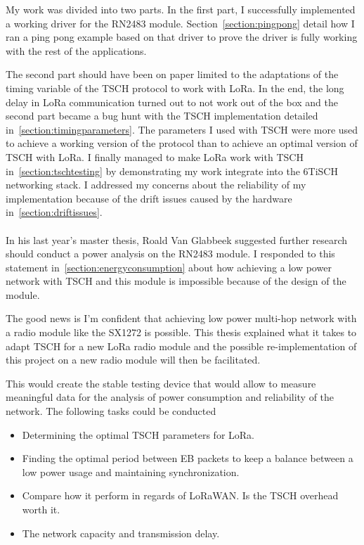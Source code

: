 \documentclass[11pt]{report}
\begin{document}
My work was divided into two parts. 
In the first part, I successfully implemented a working driver for the RN2483
module. 
Section~\ref{section:pingpong} detail how I ran a ping pong
example based on that driver to prove the driver is fully working with the
rest of the applications.

The second part should have been on paper limited to the adaptations of the
timing variable of the TSCH protocol to work with LoRa.
In the end, the long delay in LoRa communication turned out to 
not work out of the box and the second part became a
bug hunt with the TSCH implementation detailed in~\ref{section:timingparameters}.
The parameters I used with TSCH were more used to achieve a working version of
the protocol than to achieve an optimal version of TSCH with LoRa.
I finally managed to make LoRa work with TSCH in~\ref{section:tschtesting} by
demonstrating my work integrate into the 6TiSCH networking stack.
I addressed my concerns about the reliability of my implementation
because of the drift issues caused by the hardware in~\ref{section:driftissues}.

\paragraph{}

In his last year's master thesis, Roald Van Glabbeek suggested further research
should conduct a power analysis on the RN2483 module.
I responded to this statement in~\ref{section:energyconsumption} about how
achieving a low power network with TSCH and this module is impossible because
of the design of the module.

The good news is I'm confident that achieving low power multi-hop network with 
a radio module like the SX1272 is possible.
This thesis explained what it takes to adapt TSCH for a new LoRa radio
module and the possible re-implementation of this project on a new radio module 
will then be facilitated. 

This would create the stable testing device that would allow to measure meaningful 
data for the analysis of power consumption and reliability of the network.
The following tasks could be conducted

\begin{itemize}
  \item Determining the optimal TSCH parameters for LoRa. 
  \item Finding the optimal period between EB packets to keep a balance between
    a low power usage and maintaining synchronization.
  \item Compare how it perform in regards of LoRaWAN. Is the TSCH overhead
    worth it.
  \item The network capacity and transmission delay.
\end{itemize}
\end{document}
